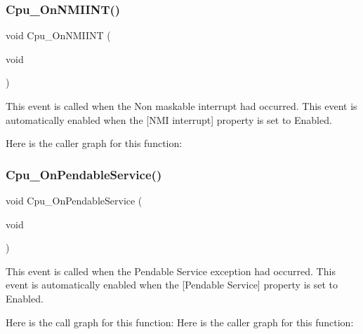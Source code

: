 \subsubsection{\texorpdfstring{Cpu\+\_\+\+On\+N\+M\+I\+I\+N\+T()}{Cpu\_OnNMIINT()}}
{\footnotesize\ttfamily void Cpu\+\_\+\+On\+N\+M\+I\+I\+NT (\begin{DoxyParamCaption}\item[{void}]{ }\end{DoxyParamCaption})}



This event is called when the Non maskable interrupt had occurred. This event is automatically enabled when the \mbox{[}N\+MI interrupt\mbox{]} property is set to \textquotesingle{}Enabled\textquotesingle{}. 

Here is the caller graph for this function\+:
\mbox{\label{group___events__module_ga8ae22afd184f10ce1e5d0870ef5d602e}} 
\subsubsection{\texorpdfstring{Cpu\+\_\+\+On\+Pendable\+Service()}{Cpu\_OnPendableService()}}
{\footnotesize\ttfamily void Cpu\+\_\+\+On\+Pendable\+Service (\begin{DoxyParamCaption}\item[{void}]{ }\end{DoxyParamCaption})}



This event is called when the Pendable Service exception had occurred. This event is automatically enabled when the \mbox{[}Pendable Service\mbox{]} property is set to \textquotesingle{}Enabled\textquotesingle{}. 

Here is the call graph for this function\+:
Here is the caller graph for this function\+:
\mbox{\label{group___events__module_ga428b28484a15546393b77d621e3f074d}} 
